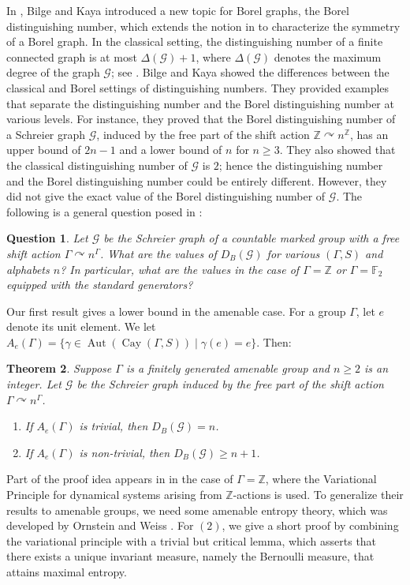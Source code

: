 \documentclass[11pt, reqno, a4paper]{amsart}
\theoremstyle{plain}
\newtheorem{theorem}{Theorem}[section]
\newtheorem{question}[theorem]{Question}
\theoremstyle{definition}
\theoremstyle{remark}
\newcommand{\Aut}{\operatorname{Aut}}
\newcommand{\Cay}{\operatorname{Cay}}
\begin{document}
In \cite{BK25}, Bilge and Kaya introduced a new topic for Borel graphs, the Borel distinguishing number, which extends the notion in \cite{AC96} to characterize the symmetry of a Borel graph. In the classical setting, the distinguishing number of a finite connected graph is at most $\Delta(\mathcal{G})+1$, where $\Delta(\mathcal{G})$ denotes the maximum degree of the graph $\mathcal{G}$; see \cite{CT06}. Bilge and Kaya showed the differences between the classical and Borel settings of distinguishing numbers. They provided examples that separate the distinguishing number and the Borel distinguishing number at various levels. For instance, they proved that the Borel distinguishing number of a Schreier graph $\mathcal{G}$, induced by the free part of the shift action $\mathbb{Z} \curvearrowright n^\mathbb{Z}$, has an upper bound of $2n-1$ and a lower bound of $n$ for $n\ge 3$. They also showed that the classical distinguishing number of $\mathcal{G}$ is $2$; hence the distinguishing number and the Borel distinguishing number could be entirely different. However, they did not give the exact value of the Borel distinguishing number of $\mathcal{G}$. The following is a general question posed in \cite{BK25}:

\begin{question}
Let $\mathcal{G}$ be the Schreier graph of a countable marked group with a free shift action $\Gamma \curvearrowright n^\Gamma$. What are the values of $D_B(\mathcal{G})$ for various $(\Gamma,S)$ and alphabets $n$? In particular, what are the values in the case of $\Gamma=\mathbb{Z}$ or $\Gamma=\mathbb{F}_2$ equipped with the standard generators?
\end{question}

Our first result gives a lower bound in the amenable case. For a group $\Gamma$, let $e$ denote its unit element. We let $A_e(\Gamma)=\{\gamma \in \Aut(\Cay(\Gamma,S)) \mid \gamma(e) = e \}.$ Then:

\begin{theorem}\label{12}
Suppose $\Gamma$ is a finitely generated amenable group and $n\ge 2$ is an integer. Let $\mathcal{G}$ be the Schreier graph induced by the free part of the shift action $\Gamma \curvearrowright n^\Gamma$. 
\begin{enumerate}
    \item If $A_{e}(\Gamma)$ is trivial, then $D_{B}(\mathcal{G})= n$.
    \item If $A_{e}(\Gamma)$ is non-trivial, then $D_{B}(\mathcal{G})\ge n+1$.
\end{enumerate}
\end{theorem}
Part of the proof idea appears in \cite[Proposition 6]{BK25} in the case of $\Gamma=\mathbb{Z}$, where the Variational Principle for dynamical systems arising from $\mathbb{Z}$-actions is used. To generalize their results to amenable groups, we need some amenable entropy theory, which was  developed by Ornstein and Weiss \cite{OW87}. For $(2)$, we give a short proof by combining the variational principle with a trivial but critical lemma, which asserts that there exists a unique invariant measure, namely the Bernoulli measure, that attains maximal entropy.
\end{document}
